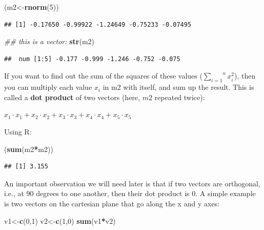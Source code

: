 \documentclass[12pt,]{krantz}
\newenvironment{Shaded}{\begin{snugshade}}{\end{snugshade}}
\newcommand{\CommentTok}[1]{\textcolor[rgb]{0.56,0.35,0.01}{\textit{#1}}}
\newcommand{\DecValTok}[1]{\textcolor[rgb]{0.00,0.00,0.81}{#1}}
\newcommand{\KeywordTok}[1]{\textcolor[rgb]{0.13,0.29,0.53}{\textbf{#1}}}
\newcommand{\NormalTok}[1]{#1}
\newcommand{\OperatorTok}[1]{\textcolor[rgb]{0.81,0.36,0.00}{\textbf{#1}}}
\begin{document}
\begin{Shaded}
\begin{Highlighting}[]
\NormalTok{(m2<-}\KeywordTok{rnorm}\NormalTok{(}\DecValTok{5}\NormalTok{))}
\end{Highlighting}
\end{Shaded}

\begin{verbatim}
## [1] -0.17650 -0.99922 -1.24649 -0.75233 -0.07495
\end{verbatim}

\begin{Shaded}
\begin{Highlighting}[]
\CommentTok{## this is a vector:}
\KeywordTok{str}\NormalTok{(m2)}
\end{Highlighting}
\end{Shaded}

\begin{verbatim}
##  num [1:5] -0.177 -0.999 -1.246 -0.752 -0.075
\end{verbatim}

If you want to find out the sum of the squares of these values (\(\overset{n}{\underset{i=1}\sum} x_i ^2\)), then you can multiply each value \(x_i\) in m2 with itself, and sum up the result. This is called a \textbf{dot product} of two vectors (here, \(m2\) repeated twice):

\(x_1 \cdot x_1+x_2 \cdot x_2+x_3 \cdot x_3+x_4 \cdot x_4+x_5 \cdot x_5\)

Using R:

\begin{Shaded}
\begin{Highlighting}[]
\NormalTok{(}\KeywordTok{sum}\NormalTok{(m2}\OperatorTok{*}\NormalTok{m2))}
\end{Highlighting}
\end{Shaded}

\begin{verbatim}
## [1] 3.155
\end{verbatim}

An important observation we will need later is that if two vectors are orthogonal, i.e., at 90 degrees to one another, then their dot product is 0. A simple example is two vectors on the cartesian plane that go along the x and y axes:

\begin{Shaded}
\begin{Highlighting}[]
\NormalTok{v1<-}\KeywordTok{c}\NormalTok{(}\DecValTok{0}\NormalTok{,}\DecValTok{1}\NormalTok{)}
\NormalTok{v2<-}\KeywordTok{c}\NormalTok{(}\DecValTok{1}\NormalTok{,}\DecValTok{0}\NormalTok{)}
\KeywordTok{sum}\NormalTok{(v1}\OperatorTok{*}\NormalTok{v2)}
\end{Highlighting}
\end{Shaded}
\end{document}
